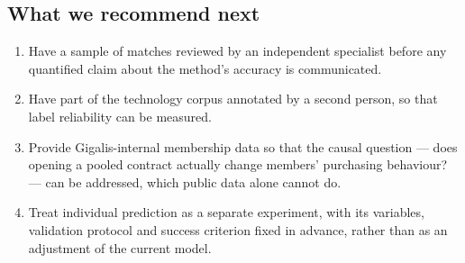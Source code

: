 \subsection*{What we recommend next}

\begin{enumerate}
\def\labelenumi{\arabic{enumi}.}
\tightlist
\item
  Have a sample of matches reviewed by an independent specialist before any quantified claim about the method's accuracy is communicated.
\item
  Have part of the technology corpus annotated by a second person, so that label reliability can be measured.
\item
  Provide Gigalis-internal membership data so that the causal question --- does opening a pooled contract actually change members' purchasing behaviour? --- can be addressed, which public data alone cannot do.
\item
  Treat individual prediction as a separate experiment, with its variables, validation protocol and success criterion fixed in advance, rather than as an adjustment of the current model.
\end{enumerate}

